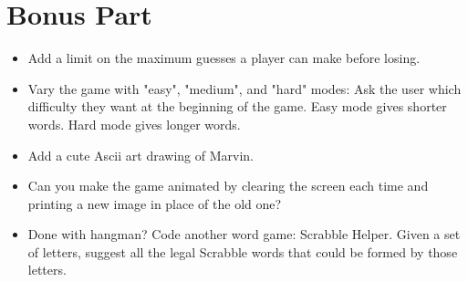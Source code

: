 \documentclass{42-en}
\begin{document}
\chapter{Bonus Part}

\begin{itemize}

\item Add a limit on the maximum guesses a player can make before losing.
\item Vary the game with "easy", "medium", and "hard" modes: Ask the user which difficulty they want at the beginning of the game. Easy mode gives shorter words. Hard mode gives longer words. 
\item Add a cute Ascii art drawing of Marvin.
\item Can you make the game animated by clearing the screen each time and printing a new image in place of the old one?
\item Done with hangman? Code another word game: Scrabble Helper. Given a set of letters, suggest all the legal Scrabble words that could be formed by those letters.

\end{itemize}

\end{document}
